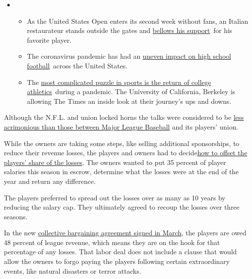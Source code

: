 \begin{itemize}
\item
  \begin{itemize}
  \tightlist
  \item
    As the United States Open enters its second week without fans, an
    Italian restaurateur stands outside the gates and
    \href{https://www.nytimes3xbfgragh.onion/2020/09/06/sports/tennis/US-Open-Matteo-Berrettini-fan.html?action=click\&pgtype=Article\&state=default\&region=MAIN_CONTENT_2\&context=storylines_keepup}{bellows
    his support}~for his favorite player.
  \item
    The coronavirus pandemic has had an
    \href{https://www.nytimes3xbfgragh.onion/2020/09/03/sports/ncaafootball/high-school-football-coronavirus-pandemic.html?action=click\&pgtype=Article\&state=default\&region=MAIN_CONTENT_2\&context=storylines_keepup}{uneven
    impact on high school football}~across the United States.
  \item
    The
    \href{https://www.nytimes3xbfgragh.onion/2020/09/02/sports/ncaafootball/coronavirus-cal-athletics-season.html?action=click\&pgtype=Article\&state=default\&region=MAIN_CONTENT_2\&context=storylines_keepup}{most
    complicated puzzle in sports is the return of college
    athletics}~during a pandemic. The University of California, Berkeley
    is allowing The Times an inside look at their journey's ups and
    downs.
  \end{itemize}
\end{itemize}

Although the N.F.L. and union locked horns the talks were considered to
be
\href{https://www.nytimes3xbfgragh.onion/2020/06/15/sports/baseball/rob-manfred-mlb-season.html}{less
acrimonious than those between Major League Baseball} and its players'
union.

While the owners are taking some steps, like selling additional
sponsorships, to reduce their revenue losses, the players and owners had
to
decide\href{https://www.nytimes3xbfgragh.onion/2020/07/02/sports/football/nfl-salary-cap-no-fans.html}{how
to offset the players' share of the losses}. The owners wanted to put 35
percent of player salaries this season in escrow, determine what the
losses were at the end of the year and return any difference.

The players preferred to spread out the losses over as many as 10 years
by reducing the salary cap. They ultimately agreed to recoup the losses
over three seasons.

In the new
\href{https://www.nytimes3xbfgragh.onion/2020/03/15/sports/football/nfl-cba-approved.html}{collective
bargaining agreement signed in March}, the players are owed 48 percent
of league revenue, which means they are on the hook for that percentage
of any losses. That labor deal does not include a clause that would
allow the owners to forgo paying the players following certain
extraordinary events, like natural disasters or terror attacks.

